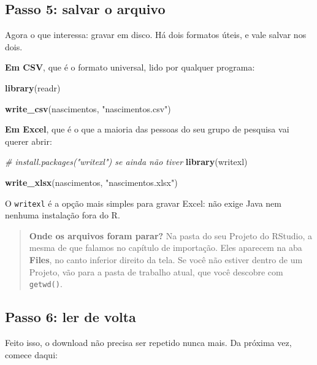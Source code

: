 \documentclass[
]{book}
\newenvironment{Shaded}{\begin{snugshade}}{\end{snugshade}}
\newcommand{\CommentTok}[1]{\textcolor[rgb]{0.56,0.35,0.01}{\textit{#1}}}
\newcommand{\FunctionTok}[1]{\textcolor[rgb]{0.13,0.29,0.53}{\textbf{#1}}}
\newcommand{\NormalTok}[1]{#1}
\newcommand{\StringTok}[1]{\textcolor[rgb]{0.31,0.60,0.02}{#1}}
\begin{document}
\subsection{Passo 5: salvar o arquivo}\label{passo-5-salvar-o-arquivo}

Agora o que interessa: gravar em disco. Há dois formatos úteis, e vale salvar nos dois.

\textbf{Em CSV}, que é o formato universal, lido por qualquer programa:

\begin{Shaded}
\begin{Highlighting}[]
\FunctionTok{library}\NormalTok{(readr)}

\FunctionTok{write\_csv}\NormalTok{(nascimentos, }\StringTok{"nascimentos.csv"}\NormalTok{)}
\end{Highlighting}
\end{Shaded}

\textbf{Em Excel}, que é o que a maioria das pessoas do seu grupo de pesquisa vai querer abrir:

\begin{Shaded}
\begin{Highlighting}[]
\CommentTok{\# install.packages("writexl")   se ainda não tiver}
\FunctionTok{library}\NormalTok{(writexl)}

\FunctionTok{write\_xlsx}\NormalTok{(nascimentos, }\StringTok{"nascimentos.xlsx"}\NormalTok{)}
\end{Highlighting}
\end{Shaded}

O \texttt{writexl} é a opção mais simples para gravar Excel: não exige Java nem nenhuma instalação fora do R.

\begin{quote}
\textbf{Onde os arquivos foram parar?} Na pasta do seu Projeto do RStudio, a mesma de que falamos no capítulo de importação. Eles aparecem na aba \textbf{Files}, no canto inferior direito da tela. Se você não estiver dentro de um Projeto, vão para a pasta de trabalho atual, que você descobre com \texttt{getwd()}.
\end{quote}

\subsection{Passo 6: ler de volta}\label{passo-6-ler-de-volta}

Feito isso, o download não precisa ser repetido nunca mais. Da próxima vez, comece daqui:
\end{document}
